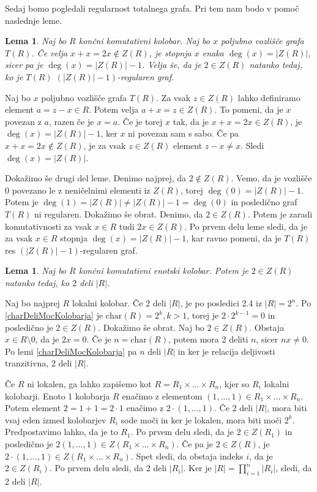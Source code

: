 \documentclass[a4paper, 12pt]{amsart}
\theoremstyle{definition} %
\theoremstyle{plain} %
\newtheorem{lema}[definicija]{Lema}
\begin{document}
Sedaj bomo pogledali regularnost totalnega grafa. Pri tem nam bodo v pomoč naslednje leme.

\begin{lema}
\label{regular1}
Naj bo $R$ končni komutativni kolobar. Naj bo $x$ poljubno vozlišče grafa $T(R)$. Če velja $x+x = 2x \notin Z(R)$, je stopnja $x$ enaka $\deg(x) = |Z(R)|$, sicer pa je $\deg(x) = |Z(R)| -1$. Velja še, da je  $2\in Z(R)$ natanko tedaj, ko je $T(R)$ $(|Z(R)| - 1)$-regularen graf. 
\end{lema}

\proof
Naj bo $x$ poljubno vozlišče grafa $T(R)$. Za vsak $z\in Z(R)$ lahko definiramo element $a = z -x \in R$. Potem velja $a + x = z\in Z(R)$. To pomeni, da je $x$ povezan z $a$, razen če je $x=a$. Če je torej $x$ tak, da je $x+x = 2x \in Z(R)$, je $\deg(x) = |Z(R)| - 1$, ker $x$ ni povezan sam s sabo. Če pa $x+x=2x \notin Z(R)$, je za vsak $z\in Z(R)$ element $z-x \neq x$. Sledi $\deg(x) = |Z(R)|$.

Dokažimo še drugi del leme. Denimo najprej, da $2\notin Z(R)$. Vemo, da je vozlišče 0 povezano le z neničelnimi elementi iz $Z(R)$, torej $\deg(0)=  |Z(R)| -1 $. Potem je $\deg(1) = |Z(R) | \neq |Z(R)| - 1= \deg(0)$ in posledično graf $T(R)$ ni regularen. 
Dokažimo še obrat. Denimo, da $2  \in Z(R)$. Potem je zaradi komutativnosti za vsak $x\in R$ tudi $2x\in Z(R)$. Po prvem delu leme sledi, da je za vsak $x\in R$ stopnja $\deg(x) = |Z(R)| - 1$, kar ravno pomeni, da je $T(R)$ res $(|Z(R)| -1)$-regularen graf.
\endproof

\begin{lema}
\label{regular2}
Naj bo $R$ končni komutativni enotski kolobar. Potem je $2\in Z(R)$ natanko tedaj, ko $2$ deli $|R|$.
\end{lema}

\proof
Naj bo najprej $R$ lokalni kolobar. Če $2$ deli $|R|$, je po posledici 2.4 iz \cite{diploma} $|R| = 2^n$. Po \ref{charDeliMocKolobarja} je $\textrm{char}(R) = 2^k, k > 1$, torej je $2 \cdot 2^{k-1} = 0$ in posledično je $2\in Z(R)$. 
Dokažimo še obrat. Naj bo $2\in Z(R)$. Obstaja $x\in R\setminus{0}$, da je $2x = 0$. Če je $n = \textrm{char}(R)$, potem mora 2 deliti $n$, sicer $nx\neq 0$. Po lemi \ref{charDeliMocKolobarja} pa $n$ deli $|R|$ in ker je relacija deljivosti tranzitivna, 2 deli $|R|$.

Če $R$ ni lokalen, ga lahko zapišemo kot $R = R_1 \times \dots \times R_n$, kjer so $R_i$ lokalni kolobarji. Enoto 1 kolobarja $R$ enačimo z elementom $(1,\dots,1)\in R_1 \times \dots \times R_n$. Potem element $2 = 1+1 = 2 \cdot 1$ enačimo z $2\cdot (1,\dots,1)$. Če $2$ deli $|R|$, mora biti vsaj eden izmed kolobarjev $R_i$ sode moči in ker je lokalen, mora biti moči $2^k$. Predpostavimo lahko, da je to $R_1$. Po prvem delu sledi, da je $2\in Z(R_1)$ in posledično je $2(1,\dots,1) \in Z(R_1\times \dots \times R_n)$. Če pa je $2\in Z(R)$, je $2\cdot (1,\dots,1) \in Z(R_1\times \dots \times R_n)$. Spet sledi, da obstaja indeks $i$, da je $2\in Z(R_i)$. Po prvem delu sledi, da 2 deli $|R_i|$. Ker je $|R| = \prod_{i=1}^n |R_i|$, sledi, da 2 deli $|R|$.
\endproof
\end{document}
